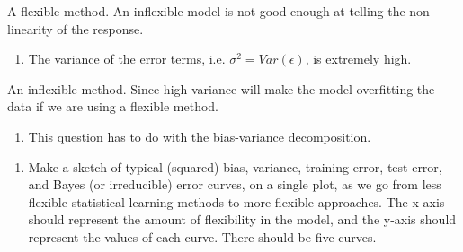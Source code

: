 \documentclass[]{article}
\providecommand{\tightlist}{%
  \setlength{\itemsep}{0pt}\setlength{\parskip}{0pt}}
\begin{document}
A flexible method. An inflexible model is not good enough at telling the
non-linearity of the response.

\begin{enumerate}
\def\labelenumi{(\alph{enumi})}
\setcounter{enumi}{3}
\tightlist
\item
  The variance of the error terms, i.e. \(\sigma^2 = Var(\epsilon)\), is
  extremely high.
\end{enumerate}

An inflexible method. Since high variance will make the model
overfitting the data if we are using a flexible method.

\begin{enumerate}
\def\labelenumi{\arabic{enumi}.}
\setcounter{enumi}{4}
\tightlist
\item
  This question has to do with the bias-variance decomposition.
\end{enumerate}

\begin{enumerate}
\def\labelenumi{(\alph{enumi})}
\tightlist
\item
  Make a sketch of typical (squared) bias, variance, training error,
  test error, and Bayes (or irreducible) error curves, on a single plot,
  as we go from less flexible statistical learning methods to more
  flexible approaches. The x-axis should represent the amount of
  flexibility in the model, and the y-axis should represent the values
  of each curve. There should be five curves.
\end{enumerate}
\end{document}
